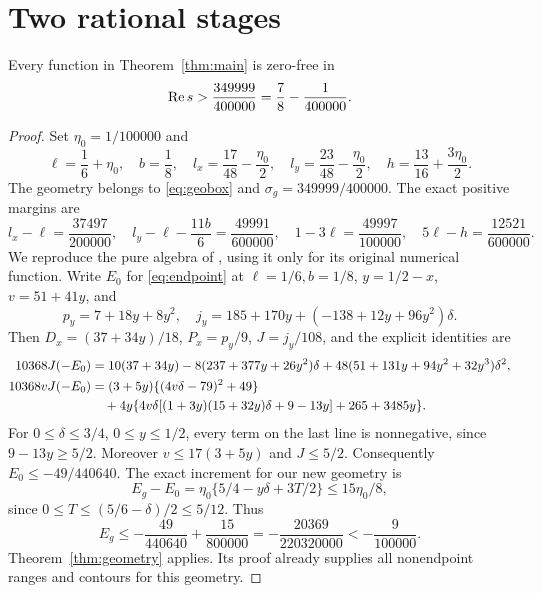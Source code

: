 \section{Two rational stages}\label{sec:rational}
\begin{theorem}\label{thm:rational1}
Every function in Theorem~\ref{thm:main} is zero-free in
\[
 \operatorname{Re} s>\frac{349999}{400000}=\frac78-\frac1{400000}.
\]
\end{theorem}
\begin{proof}
Set $\eta_0=1/100000$ and
\[
 \ell=\frac16+\eta_0,\quad b=\frac18,\quad
 l_x=\frac{17}{48}-\frac{\eta_0}2,\quad
 l_y=\frac{23}{48}-\frac{\eta_0}2,\quad
 h=\frac{13}{16}+\frac{3\eta_0}2.
\]
The geometry belongs to \eqref{eq:geobox} and $\sigma_g=349999/400000$.
The exact positive margins are
\[
 l_x-\ell=\frac{37497}{200000},\quad
 l_y-\ell-\frac{11b}6=\frac{49991}{600000},\quad
 1-3\ell=\frac{49997}{100000},\quad
 5\ell-h=\frac{12521}{600000}.
\]
We reproduce the pure algebra of , using it only for its original numerical function. Write $E_0$ for \eqref{eq:endpoint} at $\ell=1/6,b=1/8$, $y=1/2-x$, $v=51+41y$, and
\[
 p_y=7+18y+8y^2,\quad
 j_y=185+170y+(-138+12y+96y^2)\delta.
\]
Then $D_x=(37+34y)/18$, $P_x=p_y/9$, $J=j_y/108$, and the explicit identities are
\begin{align}
 10368J(-E_0)
 &=10(37+34y)-8(237+377y+26y^2)\delta
       +48(51+131y+94y^2+32y^3)\delta^2,\label{eq:oldpoly}\\
 10368vJ(-E_0)
 &=(3+5y)\{(4v\delta-79)^2+49\}\notag\\
 &\quad+4y\{4v\delta[(1+3y)(15+32y)\delta+9-13y]+265+3485y\}.
 \label{eq:oldsquare}
\end{align}
For $0\le\delta\le3/4$, $0\le y\le1/2$, every term on the last line is nonnegative, since $9-13y\ge5/2$. Moreover $v\le17(3+5y)$ and $J\le5/2$. Consequently $E_0\le-49/440640$.
The exact increment for our new geometry is
\[
 E_g-E_0=\eta_0\{5/4-y\delta+3T/2\}
 \le15\eta_0/8,
\]
since $0\le T\le(5/6-\delta)/2\le5/12$. Thus
\[
 E_g\le-\frac{49}{440640}+\frac{15}{800000}
       =-\frac{20369}{220320000}<-\frac9{100000}.
\]
Theorem~\ref{thm:geometry} applies. Its proof already supplies all nonendpoint ranges and contours for this geometry.
\end{proof}

